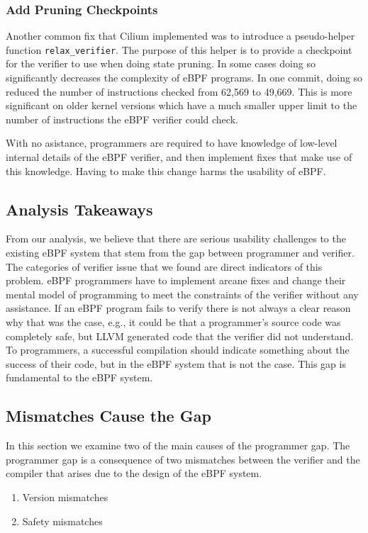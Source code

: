 {{{{{{{{\subsubsection{Add Pruning Checkpoints}
Another common fix that Cilium implemented was to introduce a pseudo-helper function \texttt{relax\_verifier}.
The purpose of this helper is to provide a checkpoint for the verifier to use when doing state pruning.
In some cases doing so significantly decreases the complexity of eBPF programs.
In one commit, doing so reduced the number of instructions checked from 62,569 to 49,669.
This is more significant on older kernel versions which have a much smaller upper limit to the number of instructions the eBPF verifier could check.

With no asistance, programmers are required to have knowledge of low-level 
    internal details of the eBPF verifier, and then implement fixes that 
    make use of this knowledge.
Having to make this change harms the usability of eBPF.


\subsection{Analysis Takeaways}
From our analysis, we believe that there are serious usability challenges to the 
    existing eBPF system that stem from the gap between programmer and verifier.
The categories of verifier issue that we found are direct indicators of this problem.
eBPF programmers have to implement arcane fixes and change their mental model of 
    programming to meet the constraints of the verifier without any assistance.
If an eBPF program fails to verify there is not always a clear reason why that was the case, e.g.,
it could be that a programmer's source code was completely safe, but LLVM generated code that the verifier did not understand.
To programmers, a successful compilation should indicate something about the success of their code, but in the eBPF system that is not the case.
This gap is fundamental to the eBPF system.


\subsection{Mismatches Cause the Gap}
In this section we examine two of the main causes of the programmer gap.
The programmer gap is a consequence of two mismatches between the verifier and the compiler that arises due to the design of the eBPF system.
    \begin{enumerate}
        \item Version mismatches
        \item Safety mismatches
    \end{enumerate}

}}}}}}}}
